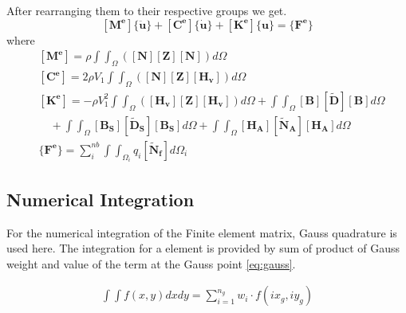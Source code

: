 \documentclass[main.tex]{subfiles}
\begin{document}
After rearranging them to their respective groups we get.
\begin{equation*}
\left[ \mathbf{M^e}  \right] 
\{ \ddot{\mathbf{u}} \}
+
\left[ \mathbf{C^e}  \right] 
\{ \dot{\mathbf{u}} \}
+
\left[ \mathbf{K^e}  \right] 
\{\mathbf{u} \}
=
\{ \mathbf{F^e} \}
\end{equation*}
where 
\begin{align*}
&\left[ \mathbf{M^e}  \right]  
= \rho
\int \int_\Omega 
\left(
\left[ \mathbf{N}  \right]
\left[ \mathbf{Z}  \right]
\left[ \mathbf{N}  \right] 
\right)  d \Omega  \\
&\left[ \mathbf{C^e}  \right]   
= 2 \rho V_1
\int \int_\Omega 
\left( 
\left[ \mathbf{N}  \right]
\left[ \mathbf{Z}  \right]
\left[ \mathbf{H_v}  \right] 
\right)  d \Omega  \\ &
\left[ \mathbf{K^e}  \right] 
=  - \rho V_1^2
\int \int_\Omega 
\left( 
\left[ \mathbf{H_v}  \right]
\left[ \mathbf{Z}  \right]
\left[ \mathbf{H_v}  \right] 
\right)  d \Omega + 
\int \int_\Omega  
\left[ \mathbf{B}  \right]
\left[ \mathbf{\tilde{D}}  \right]
\left[ \mathbf{B}  \right]  
  d \Omega   \\  &  \quad +
  \int \int_\Omega  
\left[ \mathbf{B_S}  \right]
\left[ \mathbf{\tilde{D}_S}  \right]
\left[ \mathbf{B_S}  \right] 
  d \Omega +
  \int \int_\Omega  
\left[ \mathbf{H_A}  \right]
\left[ \mathbf{\tilde{N}_A}  \right]
\left[ \mathbf{H_A}  \right]  
  d \Omega  \\ &
\{ \mathbf{F^e} \}  = 
 \sum_i^{nb}   \int  \int_{\Omega_i}   
 q_i 
\left[ \mathbf{\tilde{N}_f}  \right] 
  d \Omega_i    
\end{align*}





\subsection{Numerical Integration}
For the numerical integration of the Finite element matrix, Gauss quadrature is used here. The integration for a element is provided by sum of product of Gauss weight and value of the term at the Gauss point \ref{eq:gauss}. 


\begin{equation} \label{eq:gauss}
\begin{split}
\int \int f(x,y) dx dy = 
 \sum_{i = 1}^{n_g}  w_i  \cdot f(ix_g,iy_g) 
\end{split}
\end{equation}
\end{document}
